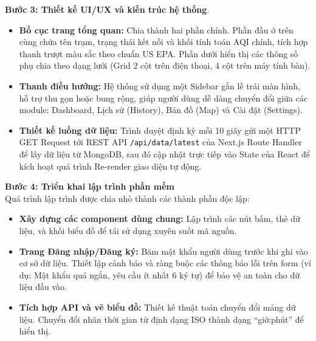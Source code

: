 \documentclass[12pt,a4paper]{article}
\begin{document}
\noindent\textbf{Bước 3: Thiết kế UI/UX và kiến trúc hệ thống}.
\begin{itemize}
    \item \textbf{Bố cục trang tổng quan:} Chia thành hai phần chính. Phần đầu ở trên cùng chứa tên trạm, trạng thái kết nối và khối tính toán AQI chính, tích hợp thanh trượt màu sắc theo chuẩn US EPA. Phần dưới hiển thị các thông số phụ chia theo dạng lưới (Grid 2 cột trên điện thoại, 4 cột trên máy tính bàn).
    \item \textbf{Thanh điều hướng:} Hệ thống sử dụng một Sidebar gắn lề trái màn hình, hỗ trợ thu gọn hoặc bung rộng, giúp người dùng dễ dàng chuyển đổi giữa các module: Dashboard, Lịch sử (History), Bản đồ (Map) và Cài đặt (Settings).
    \item \textbf{Thiết kế luồng dữ liệu:} Trình duyệt định kỳ mỗi 10 giây gửi một HTTP GET Request tới REST API \texttt{/api/data/latest} của Next.js Route Handler để lấy dữ liệu từ MongoDB, sau đó cập nhật trực tiếp vào State của React để kích hoạt quá trình Re-render giao diện tự động.
\end{itemize}

\noindent\textbf{Bước 4: Triển khai lập trình phần mềm}\mbox{}\\
Quá trình lập trình được chia nhỏ thành các thành phần độc lập:
\begin{itemize}
    \item \textbf{Xây dựng các component dùng chung:} Lập trình các nút bấm, thẻ dữ liệu, và khối biểu đồ để tái sử dụng xuyên suốt mã nguồn.
    \item \textbf{Trang Đăng nhập/Đăng ký:} Băm mật khẩu người dùng trước khi ghi vào cơ sở dữ liệu. Thiết lập cảnh báo và ràng buộc các thông báo lỗi trên form (ví dụ: Mật khẩu quá ngắn, yêu cầu ít nhất 6 ký tự) để bảo vệ an toàn cho dữ liệu đầu vào.
    \item \textbf{Tích hợp API và vẽ biểu đồ:} Thiết kế thuật toán chuyển đổi mảng dữ liệu. Chuyển đổi nhãn thời gian từ định dạng ISO thành dạng ``giờ:phút'' để hiển thị. 
\end{itemize}
\end{document}
